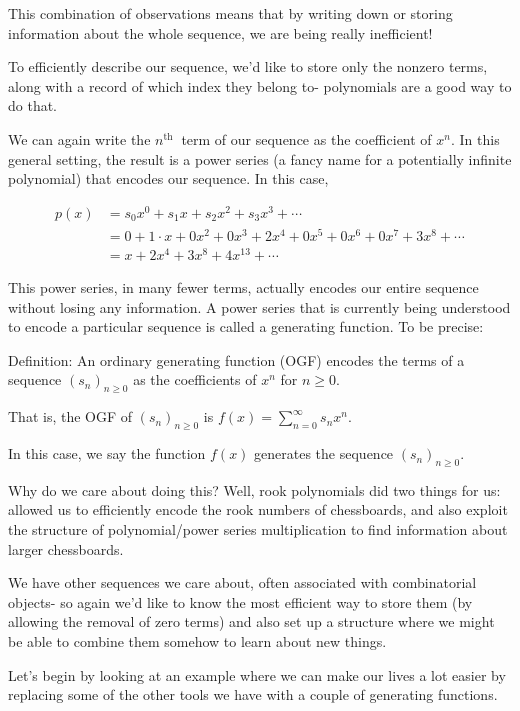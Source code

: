 \documentclass{article}
\begin{document}
This combination of observations means that by writing down or storing information about the whole sequence, we are being really inefficient!

To efficiently describe our sequence, we'd like to store only the nonzero terms, along with a record of which index they belong to- polynomials are a good way to do that.

We can again write the $n^{\text {th }}$ term of our sequence as the coefficient of $x^{n}$. In this general setting, the result is a power series (a fancy name for a potentially infinite polynomial) that encodes our sequence. In this case,

$$
\begin{aligned}
p(x) & =s_{0} x^{0}+s_{1} x+s_{2} x^{2}+s_{3} x^{3}+\cdots \\
& =0+1 \cdot x+0 x^{2}+0 x^{3}+2 x^{4}+0 x^{5}+0 x^{6}+0 x^{7}+3 x^{8}+\cdots \\
& =x+2 x^{4}+3 x^{8}+4 x^{13}+\cdots
\end{aligned}
$$

This power series, in many fewer terms, actually encodes our entire sequence without losing any information. A power series that is currently being understood to encode a particular sequence is called a generating function. To be precise:

Definition: An ordinary generating function (OGF) encodes the terms of a sequence $\left(s_{n}\right)_{n \geq 0}$ as the coefficients of $x^{n}$ for $n \geq 0$.

That is, the OGF of $\left(s_{n}\right)_{n \geq 0}$ is $f(x)=\sum_{n=0}^{\infty} s_{n} x^{n}$.

In this case, we say the function $f(x)$ generates the sequence $\left(s_{n}\right)_{n \geq 0}$.

Why do we care about doing this? Well, rook polynomials did two things for us: allowed us to efficiently encode the rook numbers of chessboards, and also exploit the structure of polynomial/power series multiplication to find information about larger chessboards.

We have other sequences we care about, often associated with combinatorial objects- so again we'd like to know the most efficient way to store them (by allowing the removal of zero terms) and also set up a structure where we might be able to combine them somehow to learn about new things.

Let's begin by looking at an example where we can make our lives a lot easier by replacing some of the other tools we have with a couple of generating functions.
\end{document}
